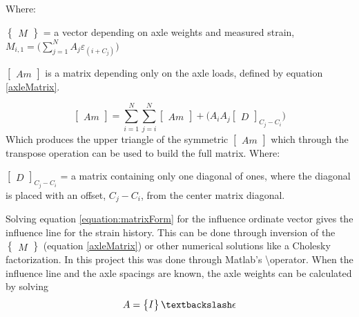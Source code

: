 Where:
\begin{description}
\item $\begin{Bmatrix} M \end{Bmatrix}$ = a vector depending on axle weights and measured strain, $M_{i, 1} = \Big(\sum_{j = 1}^{N} A_j \varepsilon_{(i+C_j)}\Big)$
\item $\begin{bmatrix} Am \end{bmatrix}$ is a matrix depending only on the axle loads, defined by equation \ref{axleMatrix}.
\end{description}
\begin{equation}
\begin{bmatrix} Am \end{bmatrix} = \sum_{i = 1}^{N} \sum_{j = i}^{N} \begin{bmatrix} Am \end{bmatrix} + \big( A_i A_j  \begin{bmatrix} D \end{bmatrix}_{C_j - C_i}\big)
\label{axleMatrix}
\end{equation}
Which produces the upper triangle of the symmetric $ \begin{bmatrix} Am \end{bmatrix} $ which through the transpose operation can be used to build the full matrix.
Where:
\begin{description}
\item $\begin{bmatrix} D \end{bmatrix}_{C_j - C_i}$ = a matrix containing only one diagonal of ones, where the diagonal is placed with an offset, $C_j - C_i$, from the center matrix diagonal.
\end{description}
Solving equation \ref{equation:matrixForm} for the influence ordinate vector gives the influence line for the strain history. This can be done through inversion of the $\begin{Bmatrix} M \end{Bmatrix}$ (equation \ref{axleMatrix}) or other numerical solutions like a Cholesky factorization. In this project this was done through Matlab's \textbackslash operator.
When the influence line and the axle spacings are known, the axle weights can be calculated by solving
\begin{equation}
	A = \begin{Bmatrix} I \end{Bmatrix} \textbackslash \epsilon
\end{equation}
